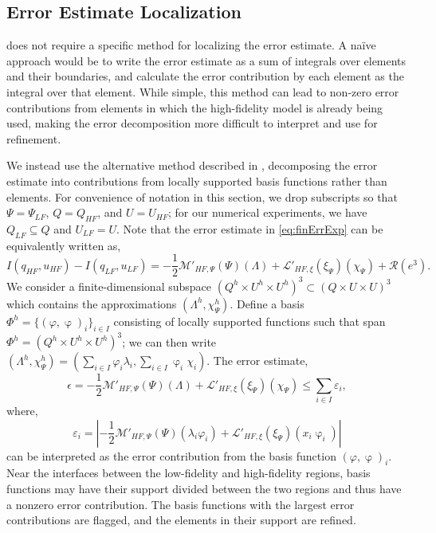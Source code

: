 \subsection{Error Estimate Localization}\label{sec:errLocal}
 does not require a specific method for localizing the error estimate. A na\"{i}ve approach would be to write the error estimate as a sum of integrals over elements and their boundaries, and calculate the error contribution by each element as the integral over that element. While simple, this method can lead to non-zero error contributions from elements in which the high-fidelity model is already being used, making the error decomposition more difficult to interpret and use for refinement.

We instead use the alternative method described in \cite{vanOpstaletal15}, decomposing the error estimate into contributions from locally supported basis functions rather than elements. For convenience of notation in this section, we drop subscripts so that $\Psi=\Psi_{LF}$, $Q=Q_{HF}$, and $U=U_{HF}$; for our numerical experiments, we have $Q_{LF}\subseteq Q$ and $U_{LF}=U$. Note that the error estimate in \cref{eq:finErrExp} can be equivalently written as,
%
\begin{equation}
I(q_{HF},u_{HF})-I(q_{LF},u_{LF})=-\frac{1}{2}\mathcal{M}'_{HF,\Psi}(\Psi)(\Lambda)+\mathcal{L}'_{HF,\xi}(\xi_\Psi)(\chi_\Psi)+\mathcal{R}(e^3). \nonumber
\end{equation}
%
We consider a finite-dimensional  subspace $(Q^h\times U^h\times U^h)^3 \subset (Q\times U\times U)^3$ which contains the approximations $(\Lambda^h,\chi_\Psi^h)$. Define a basis $\Phi^h=\{(\varphi,\upvarphi)_i\}_{i\in I}$ consisting of locally supported functions such that span $\Phi^h=(Q^h\times U^h\times U^h)^3$; we can then write $(\Lambda^h,\chi_\Psi^h)=(\sum\limits_{i\in I}\varphi_i\lambda_i,\sum\limits_{i\in I}\upvarphi_i \chi_i)$. The error estimate,
%
\begin{equation}
\epsilon = -\frac{1}{2}\mathcal{M}'_{HF,\Psi}(\Psi)(\Lambda)+\mathcal{L}'_{HF,\xi}(\xi_\Psi)(\chi_\Psi) \leq \sum_{i\in I} \varepsilon_i,
\end{equation}
%
where,
%
\begin{equation}\label{eq:basisblame}
\varepsilon_i = \left| -\frac{1}{2}\mathcal{M}'_{HF,\Psi}(\Psi)(\lambda_i\varphi_i)+\mathcal{L}'_{HF,\xi}(\xi_\Psi)(x_i\upvarphi_i) \right|
\end{equation}
%
can be interpreted as the error contribution from the basis function $(\varphi,\upvarphi)_i$. Near the interfaces between the low-fidelity and high-fidelity regions, basis functions may have their support divided between the two regions and thus have a nonzero error contribution. The basis functions with the largest error contributions are flagged, and the elements in their support are refined.  


